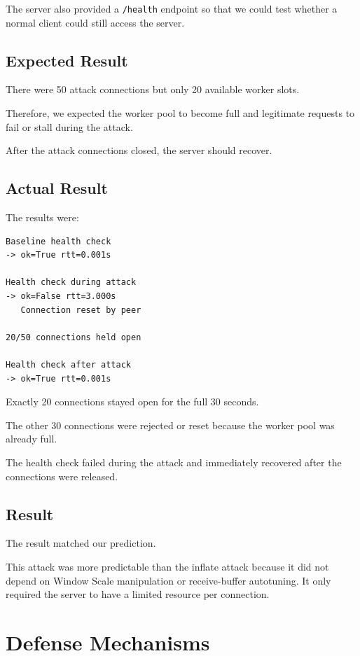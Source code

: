 \documentclass[11pt]{article}
\begin{document}
The server also provided a \texttt{/health} endpoint so that we could
test whether a normal client could still access the server.

\subsection{Expected Result}

There were 50 attack connections but only 20 available worker slots.

Therefore, we expected the worker pool to become full and legitimate
requests to fail or stall during the attack.

After the attack connections closed, the server should recover.

\subsection{Actual Result}

The results were:

\begin{lstlisting}
Baseline health check
-> ok=True rtt=0.001s

Health check during attack
-> ok=False rtt=3.000s
   Connection reset by peer

20/50 connections held open

Health check after attack
-> ok=True rtt=0.001s
\end{lstlisting}

Exactly 20 connections stayed open for the full 30 seconds.

The other 30 connections were rejected or reset because the worker
pool was already full.

The health check failed during the attack and immediately recovered
after the connections were released.

\subsection{Result}

The result matched our prediction.

This attack was more predictable than the inflate attack because it
did not depend on Window Scale manipulation or receive-buffer
autotuning. It only required the server to have a limited resource
per connection.

\section{Defense Mechanisms}
\end{document}
